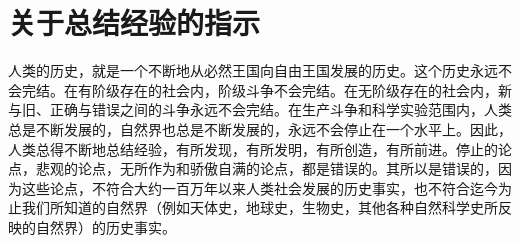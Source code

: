 \section[关于总结经验的指示（一九六四年十二月）]{关于总结经验的指示}


人类的历史，就是一个不断地从必然王国向自由王国发展的历史。这个历史永远不会完结。在有阶级存在的社会内，阶级斗争不会完结。在无阶级存在的社会内，新与旧、正确与错误之间的斗争永远不会完结。在生产斗争和科学实验范围内，人类总是不断发展的，自然界也总是不断发展的，永远不会停止在一个水平上。因此，人类总得不断地总结经验，有所发现，有所发明，有所创造，有所前进。停止的论点，悲观的论点，无所作为和骄傲自满的论点，都是错误的。其所以是错误的，因为这些论点，不符合大约一百万年以来人类社会发展的历史事实，也不符合迄今为止我们所知道的自然界（例如天体史，地球史，生物史，其他各种自然科学史所反映的自然界）的历史事实。

